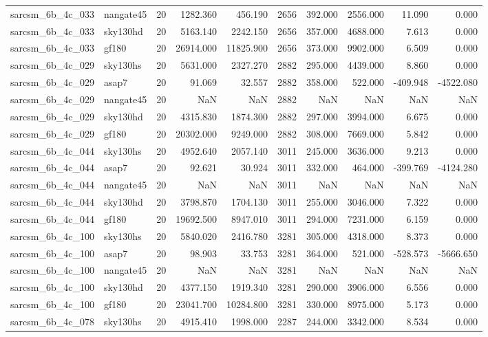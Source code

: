 \begin{tabular}{llrrrrrrrr}
sarcsm\_6b\_4c\_033 & nangate45 & 20 & 1282.360 & 456.190 & 2656 & 392.000 & 2556.000 & 11.090 & 0.000 \\
sarcsm\_6b\_4c\_033 & sky130hd & 20 & 5163.140 & 2242.150 & 2656 & 357.000 & 4688.000 & 7.613 & 0.000 \\
sarcsm\_6b\_4c\_033 & gf180 & 20 & 26914.000 & 11825.900 & 2656 & 373.000 & 9902.000 & 6.509 & 0.000 \\
sarcsm\_6b\_4c\_029 & sky130hs & 20 & 5631.000 & 2327.270 & 2882 & 295.000 & 4439.000 & 8.860 & 0.000 \\
sarcsm\_6b\_4c\_029 & asap7 & 20 & 91.069 & 32.557 & 2882 & 358.000 & 522.000 & -409.948 & -4522.080 \\
sarcsm\_6b\_4c\_029 & nangate45 & 20 & NaN & NaN & 2882 & NaN & NaN & NaN & NaN \\
sarcsm\_6b\_4c\_029 & sky130hd & 20 & 4315.830 & 1874.300 & 2882 & 297.000 & 3994.000 & 6.675 & 0.000 \\
sarcsm\_6b\_4c\_029 & gf180 & 20 & 20302.000 & 9249.000 & 2882 & 308.000 & 7669.000 & 5.842 & 0.000 \\
sarcsm\_6b\_4c\_044 & sky130hs & 20 & 4952.640 & 2057.140 & 3011 & 245.000 & 3636.000 & 9.213 & 0.000 \\
sarcsm\_6b\_4c\_044 & asap7 & 20 & 92.621 & 30.924 & 3011 & 332.000 & 464.000 & -399.769 & -4124.280 \\
sarcsm\_6b\_4c\_044 & nangate45 & 20 & NaN & NaN & 3011 & NaN & NaN & NaN & NaN \\
sarcsm\_6b\_4c\_044 & sky130hd & 20 & 3798.870 & 1704.130 & 3011 & 255.000 & 3046.000 & 7.322 & 0.000 \\
sarcsm\_6b\_4c\_044 & gf180 & 20 & 19692.500 & 8947.010 & 3011 & 294.000 & 7231.000 & 6.159 & 0.000 \\
sarcsm\_6b\_4c\_100 & sky130hs & 20 & 5840.020 & 2416.780 & 3281 & 305.000 & 4318.000 & 8.373 & 0.000 \\
sarcsm\_6b\_4c\_100 & asap7 & 20 & 98.903 & 33.753 & 3281 & 364.000 & 521.000 & -528.573 & -5666.650 \\
sarcsm\_6b\_4c\_100 & nangate45 & 20 & NaN & NaN & 3281 & NaN & NaN & NaN & NaN \\
sarcsm\_6b\_4c\_100 & sky130hd & 20 & 4377.150 & 1919.340 & 3281 & 290.000 & 3906.000 & 6.556 & 0.000 \\
sarcsm\_6b\_4c\_100 & gf180 & 20 & 23041.700 & 10284.800 & 3281 & 330.000 & 8975.000 & 5.173 & 0.000 \\
sarcsm\_6b\_4c\_078 & sky130hs & 20 & 4915.410 & 1998.000 & 2287 & 244.000 & 3342.000 & 8.534 & 0.000 \\

\end{tabular}
